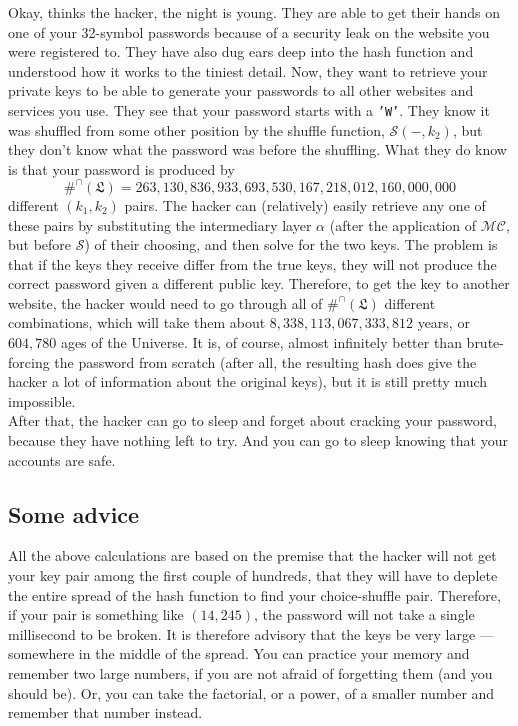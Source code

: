 \documentclass[12pt, a4paper]{article}
\renewcommand{\C}{\mathcal{C}}
\renewcommand{\S}{\mathcal{S}}
\newcommand{\M}{\mathcal{M}}
\newcommand{\conf}{\mathfrak{L}}
\begin{document}
Okay, thinks the hacker, the night is young. They are able to get their hands on one of your 32-symbol passwords because of a security leak on the website you were registered to. They have also dug ears deep into the hash function and understood how it works to the tiniest detail. Now, they want to retrieve your private keys to be able to generate your passwords to all other websites and services you use. They see that your password starts with a \texttt{'W'}. They know it was shuffled from some other position by the shuffle function, $ \S(-, k_2) $, but they don't know what the password was before the shuffling. What they do know is that your password is produced by
\[ \#^{\cap}(\conf) = 263,130,836,933,693,530,167,218,012,160,000,000 \]
different $ (k_1, k_2) $ pairs. The hacker can (relatively) easily retrieve any one of these pairs by substituting the intermediary layer $ \alpha $ (after the application of $ \M\C $, but before $ \S $) of their choosing, and then solve for the two keys. The problem is that if the keys they receive differ from the true keys, they will not produce the correct password given a different public key. Therefore, to get the key to another website, the hacker would need to go through all of $ \#^{\cap}(\conf) $ different combinations, which will take them about $ 8,338,113,067,333,812 $ years, or $ 604,780 $ ages of the Universe. It is, of course, almost infinitely better than brute-forcing the password from scratch (after all, the resulting hash does give the hacker a lot of information about the original keys), but it is still pretty much impossible.\\

After that, the hacker can go to sleep and forget about cracking your password, because they have nothing left to try. And you can go to sleep knowing that your accounts are safe.

\subsection{Some advice}

All the above calculations are based on the premise that the hacker will not get your key pair among the first couple of hundreds, that they will have to deplete the entire spread of the hash function to find your choice-shuffle pair. Therefore, if your pair is something like $ (14, 245) $, the password will not take a single millisecond to be broken. It is therefore advisory that the keys be very large --- somewhere in the middle of the spread. You can practice your memory and remember two large numbers, if you are not afraid of forgetting them (and you should be). Or, you can take the factorial, or a power, of a smaller number and remember that number instead.\\
\end{document}
